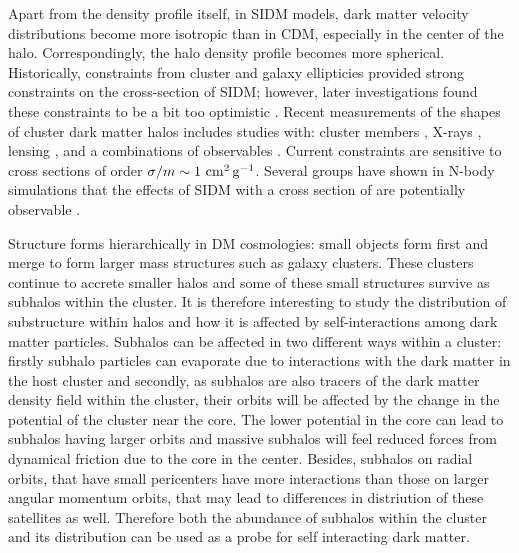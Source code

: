 Apart from the density profile itself, in SIDM models, dark matter velocity distributions become more isotropic than in CDM, especially in the center of the halo.  Correspondingly,  the halo density profile becomes more spherical.  Historically, constraints from cluster and galaxy ellipticies \citep{Miralde-Escuda:2000} provided strong constraints on the cross-section of SIDM; however, later investigations found these constraints to be a bit too optimistic \citep{Peter:2013}. 
Recent measurements of the shapes of cluster dark matter halos includes studies with: cluster members \citep{2018MNRAS.475.2421S},  X-rays \citep{Hashimoto:2007},  lensing \citep{Mandelbaum:2006, Evans:2009, Oguri:2010}, and a combinations of observables \citep{Clampitt:2016, Sereno:2018}.  
Current constraints are sensitive to cross sections of order $\sigma / m \sim 1 \mathrm{\,\mathrm{\,cm}^2\mathrm{\,g}^{-1}}$.
Several groups have shown in N-body simulations that the effects of SIDM with a cross section of  are potentially observable \citep[\eg][]{Peter:2013, Robertson:2018, Brinckmann:2018}.





Structure forms hierarchically in DM cosmologies: small objects form first and merge to form larger mass structures such as galaxy clusters. These clusters continue to accrete smaller halos and some of these small structures survive as subhalos within the cluster. It is therefore interesting to study the distribution of substructure within halos and how it is affected by self-interactions among dark matter particles. Subhalos can be affected in two different ways within a cluster: firstly  subhalo particles can evaporate due to interactions with the dark matter in the host cluster and secondly, as subhalos are also tracers of the dark matter density field within the cluster, their orbits will be affected by the change in the potential of the cluster near the core. The lower potential in the core can lead to subhalos having larger orbits and massive subhalos will feel reduced forces from dynamical friction due to the core in the center. Besides, subhalos on radial orbits, that have small pericenters have more interactions than those on larger angular momentum orbits, that may lead to differences in distriution of these satellites as well.  Therefore both the abundance of subhalos within the cluster and its distribution can be used as a probe for self interacting dark matter.  


